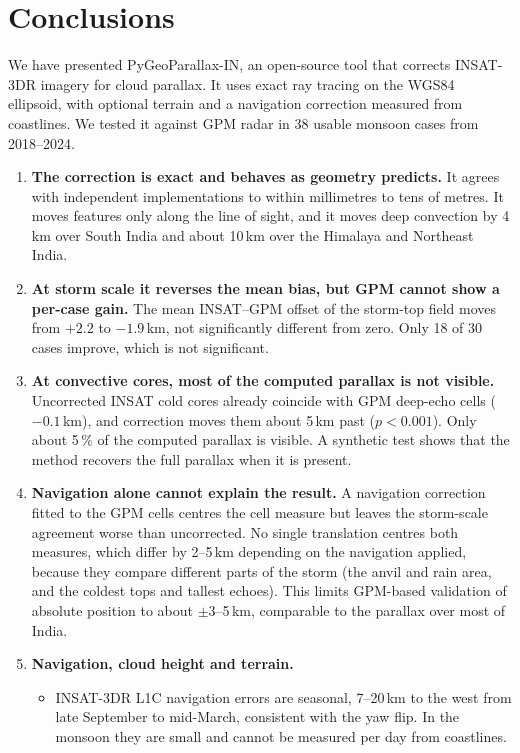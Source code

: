 \section{Conclusions}
\label{sec:conclusions}

We have presented PyGeoParallax-IN, an open-source tool that corrects INSAT-3DR imagery for cloud parallax. It uses exact ray tracing on the WGS84 ellipsoid, with optional terrain and a navigation correction measured from coastlines. We tested it against GPM radar in 38 usable monsoon cases from 2018--2024.

\begin{enumerate}
  \item \textbf{The correction is exact and behaves as geometry predicts.} It agrees with independent implementations to within millimetres to tens of metres. It moves features only along the line of sight, and it moves deep convection by 4\,km over South India and about 10\,km over the Himalaya and Northeast India.
  \item \textbf{At storm scale it reverses the mean bias, but GPM cannot show a per-case gain.} The mean INSAT--GPM offset of the storm-top field moves from $+2.2$ to $-1.9$\,km, not significantly different from zero. Only 18 of 30 cases improve, which is not significant.
  \item \textbf{At convective cores, most of the computed parallax is not visible.} Uncorrected INSAT cold cores already coincide with GPM deep-echo cells ($-0.1$\,km), and correction moves them about 5\,km past ($p<0.001$). Only about 5\,\% of the computed parallax is visible. A synthetic test shows that the method recovers the full parallax when it is present.
  \item \textbf{Navigation alone cannot explain the result.} A navigation correction fitted to the GPM cells centres the cell measure but leaves the storm-scale agreement worse than uncorrected. No single translation centres both measures, which differ by 2--5\,km depending on the navigation applied, because they compare different parts of the storm (the anvil and rain area, and the coldest tops and tallest echoes). This limits GPM-based validation of absolute position to about $\pm$3--5\,km, comparable to the parallax over most of India.
  \item \textbf{Navigation, cloud height and terrain.}
  \begin{itemize}
    \item INSAT-3DR L1C navigation errors are seasonal, 7--20\,km to the west from late September to mid-March, consistent with the yaw flip. In the monsoon they are small and cannot be measured per day from coastlines.

\end{itemize}
\end{enumerate}
